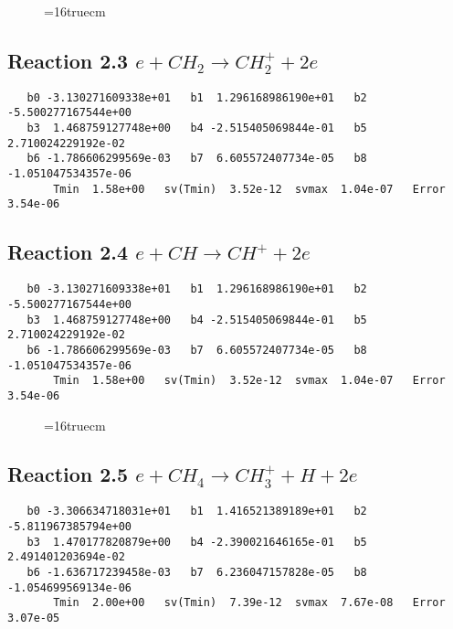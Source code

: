 \documentclass[12pt]{article}
\begin{document}
\begin{figure} \label{met.2_2.1}
\epsfxsize=16truecm
\end{figure}
\newpage
 
\subsection{ 
Reaction 2.3      $e + CH_2 \rightarrow CH_2^+ + 2e$
}

\begin{small}\begin{verbatim} 
   b0 -3.130271609338e+01   b1  1.296168986190e+01   b2 -5.500277167544e+00
   b3  1.468759127748e+00   b4 -2.515405069844e-01   b5  2.710024229192e-02
   b6 -1.786606299569e-03   b7  6.605572407734e-05   b8 -1.051047534357e-06
       Tmin  1.58e+00   sv(Tmin)  3.52e-12  svmax  1.04e-07   Error  3.54e-06
\end{verbatim}\end{small}

\subsection{ 
Reaction 2.4      $e + CH \rightarrow CH^+ +2e$
}

\begin{small}\begin{verbatim} 
   b0 -3.130271609338e+01   b1  1.296168986190e+01   b2 -5.500277167544e+00
   b3  1.468759127748e+00   b4 -2.515405069844e-01   b5  2.710024229192e-02
   b6 -1.786606299569e-03   b7  6.605572407734e-05   b8 -1.051047534357e-06
       Tmin  1.58e+00   sv(Tmin)  3.52e-12  svmax  1.04e-07   Error  3.54e-06
\end{verbatim}\end{small}

\begin{figure} \label{met.2_2.3}
\epsfxsize=16truecm
\end{figure}
\newpage
 
\subsection{
Reaction 2.5       $e + CH_4 \rightarrow CH_3^+ + H + 2e$
}

\begin{small}\begin{verbatim} 
   b0 -3.306634718031e+01   b1  1.416521389189e+01   b2 -5.811967385794e+00
   b3  1.470177820879e+00   b4 -2.390021646165e-01   b5  2.491401203694e-02
   b6 -1.636717239458e-03   b7  6.236047157828e-05   b8 -1.054699569134e-06
       Tmin  2.00e+00   sv(Tmin)  7.39e-12  svmax  7.67e-08   Error  3.07e-05
\end{verbatim}\end{small}
\end{document}
